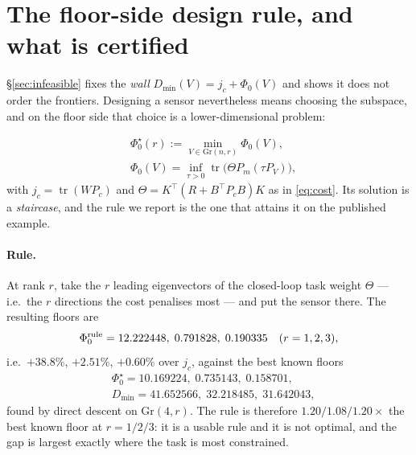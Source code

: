 \section{The floor-side design rule, and what is certified}\label{sec:floor}

\S\ref{sec:infeasible} fixes the \emph{wall} $D_{\min}(V)=j_c+\Phi_0(V)$ and shows
it does not order the frontiers. Designing a sensor nevertheless means choosing
the subspace, and on the floor side that choice is a lower-dimensional problem:

\begin{equation}
  \begin{aligned}
  &\Phi_0^{\star}(r):=\min_{V\in\mathrm{Gr}(n,r)}\Phi_0(V),\\
  &\Phi_0(V)=\inf_{\tau>0}\operatorname{tr}\big(\Theta P_m(\tau P_V)\big),
  \end{aligned}
  \label{eq:flooropt}
\end{equation}
with $j_c=\operatorname{tr}(WP_c)$ and $\Theta=K^{\top}(R+B^{\top}P_cB)K$ as in
\eqref{eq:cost}. Its solution is a \emph{staircase}, and the rule we report is the
one that attains it on the published example.

\paragraph{Rule.} At rank $r$, take the $r$ leading eigenvectors of the
closed-loop task weight $\Theta$ --- i.e.\ the $r$ directions the cost penalises
most --- and put the sensor there. The resulting floors are
\begin{equation}
  \Phi_0^{\rm rule}=12.222448,\;0.791828,\;0.190335
  \quad(r=1,2,3),
  \label{eq:rule}
\end{equation}
i.e.\ $+38.8\%$, $+2.51\%$, $+0.60\%$ over $j_c$, against the best known floors
\begin{equation}
  \begin{aligned}
  &\Phi_0^{\star}=10.169224,\;0.735143,\;0.158701,\\
  &D_{\min}=41.652566,\;32.218485,\;31.642043,
  \end{aligned}
  \label{eq:bestfloor}
\end{equation}
found by direct descent on $\mathrm{Gr}(4,r)$. The rule is therefore
$1.20/1.08/1.20\times$ the best known floor at $r=1/2/3$: it is a usable rule and
it is not optimal, and the gap is largest exactly where the task is most
constrained.

